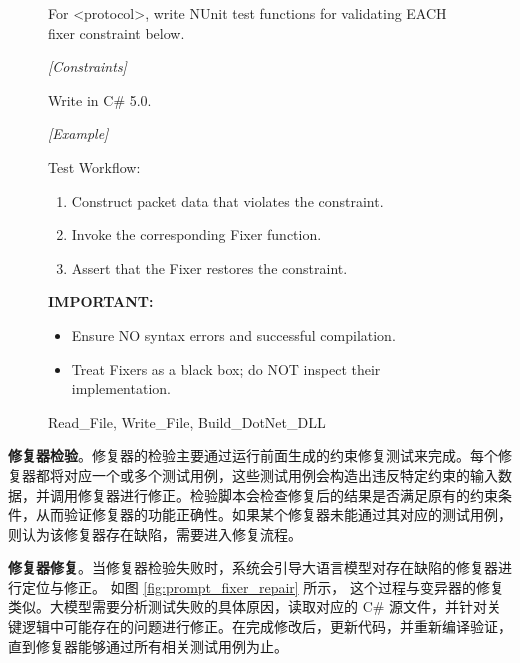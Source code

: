 \begin{figure}[H]
\centering
\begin{tcolorbox}[
  before upper=\linespread{1.2}\selectfont
]
 For <protocol>, write NUnit test functions for validating EACH fixer constraint below.

\textit{[Constraints]}


Write in C\# 5.0.

\textit{[Example]}

{Test Workflow:}
\begin{enumerate}[noitemsep]
    \item Construct packet data that violates the constraint.
    \item Invoke the corresponding Fixer function.
    \item Assert that the Fixer restores the constraint.
\end{enumerate}

\textbf{IMPORTANT:}
\begin{itemize}[noitemsep]
    \item Ensure NO syntax errors and successful compilation.
    \item Treat Fixers as a black box; do NOT inspect their implementation.
\end{itemize}

\prule

 Read\_File, Write\_File, Build\_DotNet\_DLL
\end{tcolorbox}
\label{fig:prompt_fixer_test}
\end{figure}

\textbf{修复器检验}。修复器的检验主要通过运行前面生成的约束修复测试来完成。每个修复器都将对应一个或多个测试用例，这些测试用例会构造出违反特定约束的输入数据，并调用修复器进行修正。检验脚本会检查修复后的结果是否满足原有的约束条件，从而验证修复器的功能正确性。如果某个修复器未能通过其对应的测试用例，则认为该修复器存在缺陷，需要进入修复流程。

\textbf{修复器修复}。当修复器检验失败时，系统会引导大语言模型对存在缺陷的修复器进行定位与修正。
如图 \ref{fig:prompt_fixer_repair} 所示，
这个过程与变异器的修复类似。大模型需要分析测试失败的具体原因，读取对应的 C\# 源文件，并针对关键逻辑中可能存在的问题进行修正。在完成修改后，更新代码，并重新编译验证，直到修复器能够通过所有相关测试用例为止。

